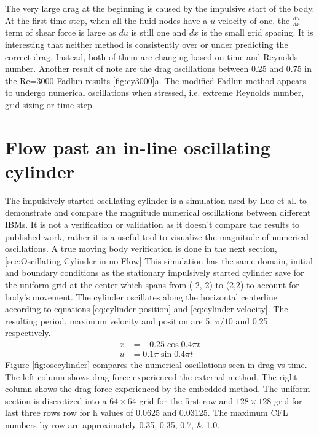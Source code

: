 The very large drag at the beginning is caused by the impulsive start of the body.
At the first time step, when all the fluid nodes have a $u$ velocity of one, the $\frac{du}{dx}$ term of shear force is large as $du$ is still one and $dx$ is the small grid spacing.
It is interesting that neither method is consistently over or under predicting the correct drag.
Instead, both of them are changing based on time and Reynolds number.
Another result of note are the drag oscillations between 0.25 and 0.75 in the Re=3000 Fadlun results \ref{fig:cy3000}a.
The modified Fadlun method appears to undergo numerical oscillations when stressed, i.e. extreme Reynolds number, grid sizing or time step. 

\section{Flow past an in-line oscillating cylinder}
\label{sec:osccylinder}
The impulsively started oscillating cylinder is a simulation used by Luo et al\cite{Luo:2012gx}. to demonstrate and compare the magnitude numerical oscillations between different IBMs. 
It is not a verification or validation as it doesn't compare the results to published work, rather it is a useful tool to visualize the magnitude of numerical oscillations.
A true moving body verification is done in the next section,\ref{sec:Oscillating Cylinder in no Flow}
This simulation has the same domain, initial and boundary conditions as the stationary impulsively started cylinder save for the uniform grid at the center which spans from (-2,-2) to (2,2) to account for body's movement.
The cylinder oscillates along the horizontal centerline according to equations \eqref{eq:cylinder position} and \eqref{eq:cylinder velocity}.
The resulting period, maximum velocity and position are 5, $\pi/10$ and 0.25 respectively.
\begin{align}
x&=-0.25\cos{0.4\pi t}\label{eq:cylinder position}\\
u&=0.1\pi\sin{0.4\pi t}\;\label{eq:cylinder velocity}
\end{align}
Figure \ref{fig:osccylinder} compares the numerical oscillations seen in drag vs time. 
The left column shows drag force experienced the external method.
The right column shows the drag force experienced by the embedded method.
The uniform section is discretized into a $64 \times 64$ grid for the first row and $ 128 \times 128$ grid for last three rows row for h values of 0.0625 and 0.03125.
The maximum CFL numbers by row are approximately \numlist{0.35; 0.35; 0.7; 1.0}.
